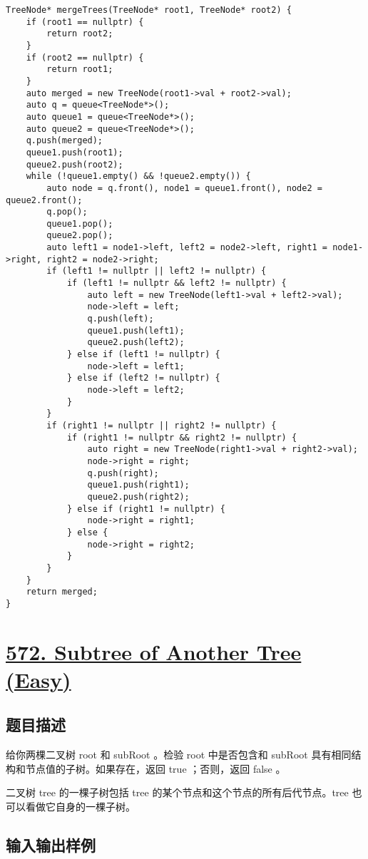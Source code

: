\documentclass[lang=cn,10pt]{elegantbook}
\begin{document}
\begin{lstlisting}
TreeNode* mergeTrees(TreeNode* root1, TreeNode* root2) {
	if (root1 == nullptr) {
		return root2;
	}
	if (root2 == nullptr) {
		return root1;
	}
	auto merged = new TreeNode(root1->val + root2->val);
	auto q = queue<TreeNode*>();
	auto queue1 = queue<TreeNode*>();
	auto queue2 = queue<TreeNode*>();
	q.push(merged);
	queue1.push(root1);
	queue2.push(root2);
	while (!queue1.empty() && !queue2.empty()) {
		auto node = q.front(), node1 = queue1.front(), node2 = queue2.front();
		q.pop();
		queue1.pop();
		queue2.pop();
		auto left1 = node1->left, left2 = node2->left, right1 = node1->right, right2 = node2->right;
		if (left1 != nullptr || left2 != nullptr) {
			if (left1 != nullptr && left2 != nullptr) {
				auto left = new TreeNode(left1->val + left2->val);
				node->left = left;
				q.push(left);
				queue1.push(left1);
				queue2.push(left2);
			} else if (left1 != nullptr) {
				node->left = left1;
			} else if (left2 != nullptr) {
				node->left = left2;
			}
		}
		if (right1 != nullptr || right2 != nullptr) {
			if (right1 != nullptr && right2 != nullptr) {
				auto right = new TreeNode(right1->val + right2->val);
				node->right = right;
				q.push(right);
				queue1.push(right1);
				queue2.push(right2);
			} else if (right1 != nullptr) {
				node->right = right1;
			} else {
				node->right = right2;
			}
		}
	}
	return merged;
}
\end{lstlisting}

{\color{red}\section{\href{https://leetcode.cn/problems/diameter-of-binary-tree/}{572. Subtree of Another Tree (Easy)}}} \label{ch14.572}

\subsection*{题目描述}

给你两棵二叉树 root 和 subRoot 。检验 root 中是否包含和 subRoot 具有相同结构和节点值的子树。如果存在，返回 true ；否则，返回 false 。

二叉树 tree 的一棵子树包括 tree 的某个节点和这个节点的所有后代节点。tree 也可以看做它自身的一棵子树。

\subsection*{输入输出样例}
\end{document}
